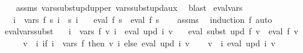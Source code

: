 \begin{isabellebody}
%
\isadelimproof
\ \ %
\endisadelimproof
%
\isatagproof
{}\isamarkupfalse%
\ assms\ vars{\isacharunderscore}{\kern0pt}subst{\isacharunderscore}{\kern0pt}upd{\isacharunderscore}{\kern0pt}upper\ vars{\isacharunderscore}{\kern0pt}subst{\isacharunderscore}{\kern0pt}upd{\isacharunderscore}{\kern0pt}aux\ \isamarkupfalse%
\ blast%
\endisatagproof
{\isafoldproof}%
%
\isadelimproof
\isanewline
%
\endisadelimproof
\isanewline
{}\isamarkupfalse%
\ eval{\isacharunderscore}{\kern0pt}vars{\isacharcolon}{\kern0pt}\isanewline
\ \ \ {\isachardoublequoteopen}{\isasymforall}i\ {\isasymin}\ vars\ f{\isachardot}{\kern0pt}\ s\ i\ {\isacharequal}{\kern0pt}\ s{\isacharprime}{\kern0pt}\ i{\isachardoublequoteclose}\isanewline
\ \ \ {\isachardoublequoteopen}eval\ f\ s\ {\isacharequal}{\kern0pt}\ eval\ f\ s{\isacharprime}{\kern0pt}{\isachardoublequoteclose}\isanewline
%
\isadelimproof
\ \ %
\endisadelimproof
%
\isatagproof
{}\isamarkupfalse%
\ assms\ \isamarkupfalse%
\ {\isacharparenleft}{\kern0pt}induction\ f{\isacharparenright}{\kern0pt}\ auto%
\endisatagproof
{\isafoldproof}%
%
\isadelimproof
\isanewline
%
\endisadelimproof
\isanewline
{}\isamarkupfalse%
\ eval{\isacharunderscore}{\kern0pt}vars{\isacharunderscore}{\kern0pt}subst{\isacharcolon}{\kern0pt}\isanewline
\ \ \ {\isachardoublequoteopen}{\isasymforall}i\ {\isasymin}\ vars\ f{\isachardot}{\kern0pt}\ v\ i\ {\isacharequal}{\kern0pt}\ eval\ {\isacharparenleft}{\kern0pt}upd\ i{\isacharparenright}{\kern0pt}\ v{\isachardoublequoteclose}\isanewline
\ \ \ {\isachardoublequoteopen}eval\ {\isacharparenleft}{\kern0pt}subst\ upd\ f{\isacharparenright}{\kern0pt}\ v\ {\isacharequal}{\kern0pt}\ eval\ f\ v{\isachardoublequoteclose}\isanewline
%
\isadelimproof
%
\endisadelimproof
%
\isatagproof
{}\isamarkupfalse%
\ {\isacharminus}{\kern0pt}\isanewline
\ \ \isamarkupfalse%
\ {\isacharquery}{\kern0pt}v{\isacharprime}{\kern0pt}\ {\isacharequal}{\kern0pt}\ {\isachardoublequoteopen}{\isasymlambda}i{\isachardot}{\kern0pt}\ if\ i\ {\isasymin}\ vars\ f\ then\ v\ i\ else\ eval\ {\isacharparenleft}{\kern0pt}upd\ i{\isacharparenright}{\kern0pt}\ v{\isachardoublequoteclose}\isanewline
\ \ \isamarkupfalse%
\ {\isacharquery}{\kern0pt}v{\isacharprime}{\kern0pt}{\isacharprime}{\kern0pt}\ {\isacharequal}{\kern0pt}\ {\isachardoublequoteopen}{\isasymlambda}i{\isachardot}{\kern0pt}\ eval\ {\isacharparenleft}{\kern0pt}upd\ i{\isacharparenright}{\kern0pt}\ v{\isachardoublequoteclose}\isanewline

\end{isabellebody}
